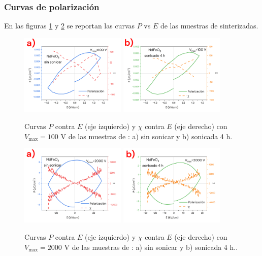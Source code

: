 \documentclass[../main.tex]{subfiles}
\begin{document}
\subsubsection{Curvas de polarización}
En las figuras \ref{fig:nd100v} y \ref{fig:nd2000v} se reportan las curvas $P$ vs $E$ de las muestras de \neod{} sinterizadas.
\begin{figure}[H]
    \centering
    \includegraphics[width=0.45\textwidth]{fig/PENdFeO3100V.png}
    \quad
    \includegraphics[width=0.45\textwidth]{fig/PENdFeO3-S100V.png}
    \caption{Curvas $P$ contra $E$ (eje izquierdo) y $\chi$ contra $E$ (eje derecho) con $V_\text{max}=100$ V de las muestras de \neod{}: a) sin sonicar y b) sonicada 4 h.}
    \label{fig:nd100v}
\end{figure}
\begin{figure}[H]
    \centering
    \includegraphics[width=0.45\textwidth]{fig/PENdFeO32000V.png}
    \quad
    \includegraphics[width=0.45\textwidth]{fig/PENdFeO3-S2000V.png}
    \caption{Curvas $P$ contra $E$ (eje izquierdo) y $\chi$ contra $E$ (eje derecho) con $V_\text{max}=2000$ V de las muestras de \neod{}: a) sin sonicar y b) sonicada 4 h..}
    \label{fig:nd2000v}
\end{figure}
\end{document}
